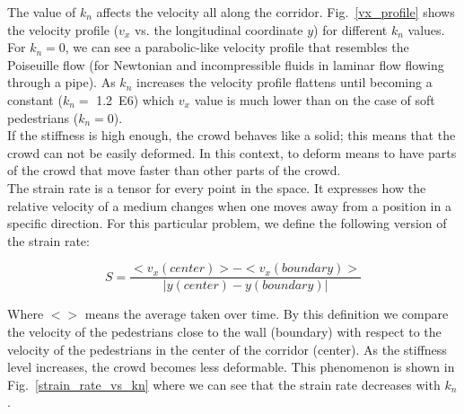 \documentclass[preprint,12pt]{elsarticle}
\begin{document}
The value of $k_n$ affects the velocity all along the corridor. Fig.~\ref{vx_profile} shows the velocity profile ($v_x$ vs. the longitudinal coordinate $y$) for different $k_n$ values. For $k_n=0$, we can see a parabolic-like velocity profile that resembles the Poiseuille flow (for Newtonian and incompressible fluids in laminar flow flowing through a pipe). As $k_n$ increases the velocity profile flattens until becoming a constant ($k_n=$ 1.2~E6) which $v_x$ value is much lower than on the case of soft pedestrians ($k_n=$0).\\

If the stiffness is high enough, the crowd behaves like a solid; this means that the crowd can not be easily deformed. In this context, to deform means to have parts of the crowd that move faster than other parts of the crowd. \\

The strain rate is a tensor for every point in the space. It expresses how the relative velocity of a medium changes when one moves away from a position in a specific direction. For this particular problem, we define the following version of the strain rate:

\begin{equation}
S = \frac{<v_x(center)> - <v_x(boundary)> }{\left | y(center) - y(boundary) \right |} 
\end{equation}

Where $<>$ means the average taken over time. By this definition we compare the velocity of the pedestrians close to the wall (boundary) with respect to the velocity of the pedestrians in the center of the corridor (center). As the stiffness level increases, the crowd becomes less deformable. This phenomenon is shown in Fig.~\ref{strain_rate_vs_kn} where we can see that the strain rate decreases with $k_n$. \\
\end{document}
